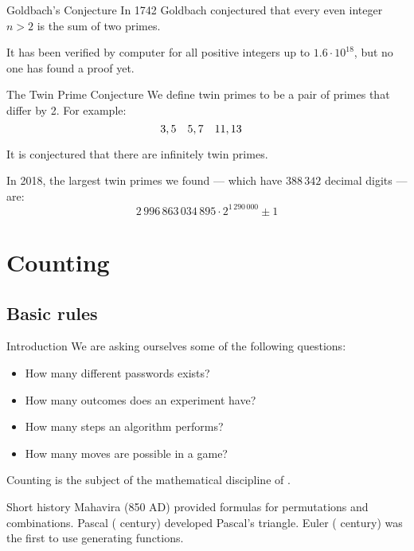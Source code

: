 \documentclass[a4paper]{article}
\begin{document}
\begin{parag}{Goldbach's Conjecture}
    In 1742 Goldbach conjectured that every even integer $n > 2$ is the sum of two primes.

    It has been verified by computer for all positive integers up to $1.6 \cdot 10^{18}$, but no one has found a proof yet. 
\end{parag}

\begin{parag}{The Twin Prime Conjecture}
    We define twin primes to be a pair of primes that differ by 2. For example: 
    \[3,5 \quad 5,7 \quad 11, 13 \quad\]
    
    It is conjectured that there are infinitely twin primes.

    In 2018, the largest twin primes we found --- which have $388\,342$ decimal digits --- are: 
    \[2\,996\,863\,034\,895 \cdot 2^{1\,290\,000} \pm 1\]
    
\end{parag}


\section{Counting}
\subsection{Basic rules}
\begin{parag}{Introduction}
    We are asking ourselves some of the following questions:
    \begin{itemize}
        \item How many different passwords exists?
        \item How many outcomes does an experiment have?
        \item How many steps an algorithm performs?
        \item How many moves are possible in a game?
    \end{itemize}

    Counting is  the subject of the mathematical discipline of .
\end{parag}

\begin{parag}{Short history}
    Mahavira (850 AD) provided formulas for permutations and combinations. Pascal ( century) developed Pascal's triangle. Euler ( century) was the first to use generating functions.
\end{parag}
\end{document}
